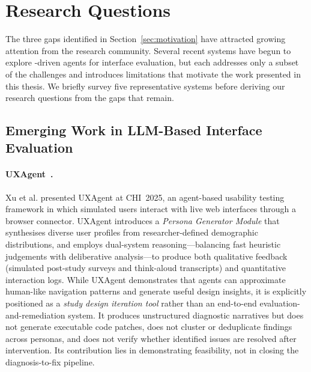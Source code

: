 \section{Research Questions}
\label{sec:research-questions}

The three gaps identified in Section~\ref{sec:motivation} have attracted growing attention from the research community. Several recent systems have begun to explore -driven agents for interface evaluation, but each addresses only a subset of the challenges and introduces limitations that motivate the work presented in this thesis. We briefly survey five representative systems before deriving our research questions from the gaps that remain.

\subsection{Emerging Work in LLM-Based Interface Evaluation}

\paragraph{UXAgent~\cite{uxagent}.}
Xu et al. presented UXAgent at CHI~2025, an  agent-based usability testing framework in which simulated users interact with live web interfaces through a browser connector. UXAgent introduces a \textit{Persona Generator Module} that synthesises diverse user profiles from researcher-defined demographic distributions, and employs dual-system reasoning---balancing fast heuristic judgements with deliberative analysis---to produce both qualitative feedback (simulated post-study surveys and think-aloud transcripts) and quantitative interaction logs. While UXAgent demonstrates that  agents can approximate human-like navigation patterns and generate useful design insights, it is explicitly positioned as a \textit{study design iteration tool} rather than an end-to-end evaluation-and-remediation system. It produces unstructured diagnostic narratives but does not generate executable code patches, does not cluster or deduplicate findings across personas, and does not verify whether identified issues are resolved after intervention. Its contribution lies in demonstrating feasibility, not in closing the diagnosis-to-fix pipeline.

